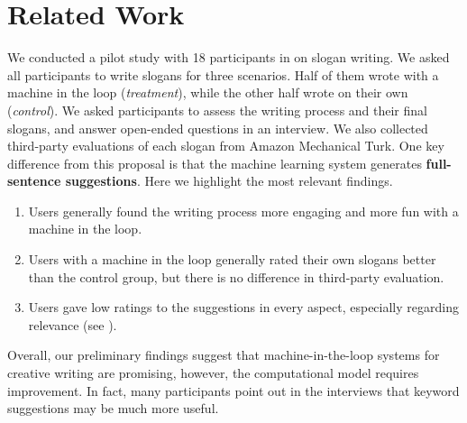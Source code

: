 
\section{Related Work}


\citep{birnholtz2013write}

 We conducted a pilot study with 18 participants in \citet{clark+etal18} on slogan writing.
We asked all participants to write slogans for three scenarios.
Half of them wrote with a machine in the loop ({\em treatment}), while the other half wrote on their own ({\em control}).
We asked participants to assess the writing process and their final slogans, and answer open-ended questions in an interview.
We also collected third-party evaluations of each slogan from Amazon Mechanical Turk.
One key difference from this proposal is that the machine learning system generates {\bf full-sentence suggestions}.
Here we highlight the most relevant findings.


\begin{enumerate}[leftmargin=*,noitemsep,topsep=0pt,parsep=0pt,partopsep=0pt]
    \item Users generally found the writing process more engaging and more fun with a machine in the loop.
    \item Users with a machine in the loop generally rated their own slogans better than the control group, but there is no difference in third-party evaluation.
    \item Users gave low ratings to the suggestions in every aspect, especially regarding relevance (see ).
\end{enumerate}

Overall, our preliminary findings suggest that machine-in-the-loop systems for creative writing are promising, however, the computational model requires improvement. 
In fact, many participants point out in the interviews that keyword suggestions may be much more useful.